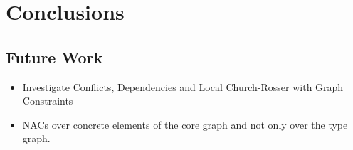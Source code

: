 \chapter{Conclusions}

\section{Future Work}

\begin{itemize}
  \item Investigate Conflicts, Dependencies and Local Church-Rosser with Graph Constraints
  \item NACs over concrete elements of the core graph and not only over the type graph. 
\end{itemize}
